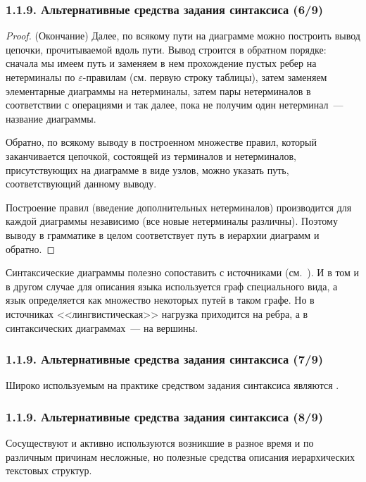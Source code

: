 \begin{frame}
\frametitle{1.1.9. Альтернативные средства задания синтаксиса (6/9)}
\begin{proof} (Окончание)
Далее, по всякому пути на диаграмме можно построить вывод цепочки,
прочитываемой вдоль пути. Вывод строится в обратном порядке:
сначала мы имеем путь и заменяем в нем прохождение пустых ребер на
нетерминалы по $\varepsilon$-правилам (см. первую строку таблицы),
затем заменяем элементарные диаграммы на нетерминалы, затем пары
нетерминалов в соответствии с операциями и так далее, пока не
получим один нетерминал~--- название диаграммы.

Обратно, по всякому выводу в построенном множестве правил, который
заканчивается цепочкой, состоящей из терминалов и нетерминалов,
присутствующих на диаграмме в виде узлов, можно указать путь,
соответствующий данному выводу.

Построение правил (введение дополнительных нетерминалов)
производится для каждой диаграммы независимо (все новые
нетерминалы различны). Поэтому выводу в грамматике в целом
соответствует путь в иерархии диаграмм и обратно.
\end{proof}

\begin{digress}
Синтаксические диаграммы полезно сопоставить с источниками
(см.~). 
И в том и в другом случае для описания
языка используется граф специального вида, а
язык определяется как множество некоторых путей в таком
графе. Но в источниках <<лингвистическая>> нагрузка приходится на
ребра, а в синтаксических диаграммах~--- на вершины.
\end{digress}

\end{frame}

\begin{frame}
\frametitle{1.1.9. Альтернативные средства задания синтаксиса (7/9)}
Широко используемым на практике средством задания синтаксиса 
являются .

\end{frame}

\begin{frame}
\frametitle{1.1.9. Альтернативные средства задания синтаксиса (8/9)}
Сосуществуют и активно используются возникшие в разное время 
и по различным причинам несложные, но полезные средства 
описания иерархических текстовых структур.

 
\end{frame}

